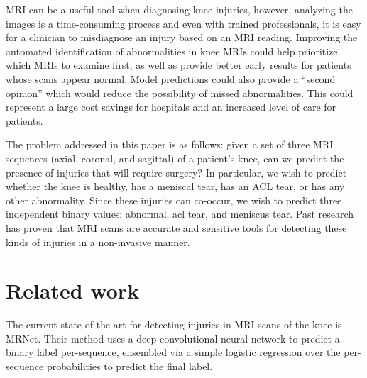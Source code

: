 \documentclass[10pt,twocolumn,letterpaper]{article}
\begin{document}
MRI can be a useful tool when diagnosing knee injuries\cite{orlando2015diagnosis,figueiredo2018use,smith2012diagnostic}, however, analyzing the images is a time-consuming process and even with trained professionals, it is easy for a clinician to misdiagnose an injury based on an MRI reading\cite{kolata2011}. Improving the automated identification of abnormalities in knee MRIs could help prioritize which MRIs to examine first, as well as provide better early results for patients whose scans appear normal. Model predictions could also provide a ``second opinion'' which would reduce the possibility of missed abnormalities. This could represent a large cost savings for hospitals and an increased level of care for patients.

The problem addressed in this paper is as follows: given a set of three MRI sequences (axial, coronal, and sagittal) of a patient's knee, can we predict the presence of injuries that will require surgery? In particular, we wish to predict whether the knee is healthy, has a meniscal tear, has an ACL tear, or has any other abnormality. Since these injuries can co-occur, we wish to predict three independent binary values: abnormal, acl tear, and meniscus tear. Past research has proven that MRI scans are accurate and sensitive tools for detecting these kinds of injuries in a non-invasive manner\cite{boeve1991magnetic,felli2016comparison,yaqoob2015diagnostic}.


\section{Related work} %

The current state-of-the-art for detecting injuries in MRI scans of the knee is MRNet\cite{bien2018deep}. Their method uses a deep convolutional neural network to predict a binary label per-sequence, ensembled via a simple logistic regression over the per-sequence probabilities to predict the final label.
\end{document}
